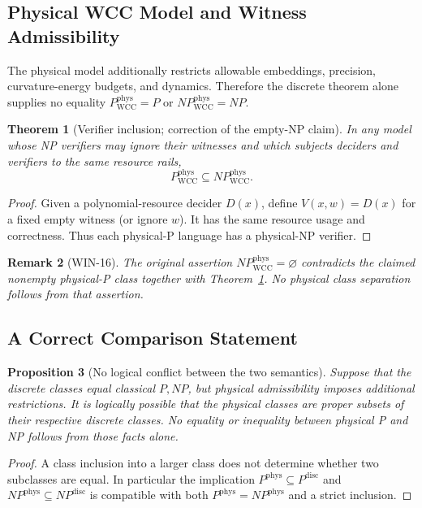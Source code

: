 \documentclass[11pt,a4paper]{article}
\newtheorem{theorem}{Theorem}[section]
\newtheorem{proposition}[theorem]{Proposition}
\newtheorem{remark}[theorem]{Remark}
\begin{document}
\subsection{Physical WCC Model and Witness Admissibility}
The physical model additionally restricts allowable embeddings, precision,
curvature-energy budgets, and dynamics. Therefore the discrete theorem
alone supplies no equality
$P^{\mathrm{phys}}_{\mathrm{WCC}}=P$ or
$NP^{\mathrm{phys}}_{\mathrm{WCC}}=NP$.

\begin{theorem}[Verifier inclusion; correction of the empty-NP claim]
\label{thm:p-in-np}
In any model whose NP verifiers may ignore their witnesses and which
subjects deciders and verifiers to the same resource rails,
\[
P^{\mathrm{phys}}_{\mathrm{WCC}}
\subseteq NP^{\mathrm{phys}}_{\mathrm{WCC}}.
\]
\end{theorem}
\begin{proof}
Given a polynomial-resource decider $D(x)$, define
$V(x,w)=D(x)$ for a fixed empty witness (or ignore $w$). It has the
same resource usage and correctness. Thus each physical-P language has
a physical-NP verifier.
\end{proof}
\begin{remark}[WIN-16]
The original assertion $NP^{\mathrm{phys}}_{\mathrm{WCC}}=\varnothing$
contradicts the claimed nonempty physical-P class together with
Theorem~\ref{thm:p-in-np}. No physical class separation follows from
that assertion.
\end{remark}

\subsection{A Correct Comparison Statement}
\begin{proposition}[No logical conflict between the two semantics]
Suppose that the discrete classes equal classical $P,NP$, but physical
admissibility imposes additional restrictions. It is logically possible
that the physical classes are proper subsets of their respective discrete
classes. No equality or inequality between physical P and NP follows from
those facts alone.
\end{proposition}
\begin{proof}
A class inclusion into a larger class does not determine whether two
subclasses are equal. In particular the implication
$P^{\mathrm{phys}}\subseteq P^{\mathrm{disc}}$ and
$NP^{\mathrm{phys}}\subseteq NP^{\mathrm{disc}}$ is compatible with both
$P^{\mathrm{phys}}=NP^{\mathrm{phys}}$ and a strict inclusion.
\end{proof}
\end{document}
